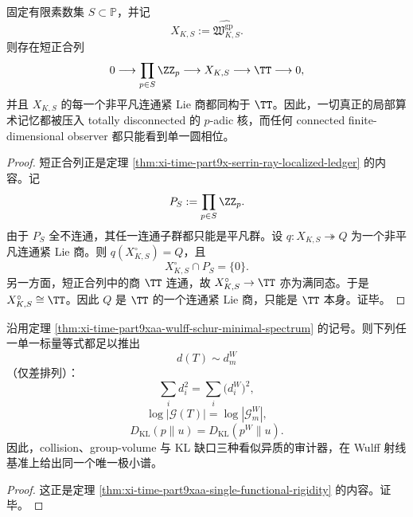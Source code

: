 \begin{theorem}\label{thm:xi-time-part9xaad-localized-wulff-connected-observer-rigidity}
固定有限素数集 \(S\subset\mathbb P\)，并记
\[
X_{K,S}:=\widehat{\mathfrak W_{K,S}^{\mathrm{gp}}}.
\]
则存在短正合列
\[
0\longrightarrow \prod_{p\in S}\ZZ_p
\longrightarrow X_{K,S}
\longrightarrow \TT
\longrightarrow 0,
\]
并且 \(X_{K,S}\) 的每一个非平凡连通紧 Lie 商都同构于 \(\TT\)。因此，一切真正的局部算术记忆都被压入 totally disconnected 的 \(p\)-adic 核，而任何 connected finite-dimensional observer 都只能看到单一圆相位。
\end{theorem}
\begin{proof}
短正合列正是定理 \ref{thm:xi-time-part9x-serrin-ray-localized-ledger} 的内容。记
\[
P_S:=\prod_{p\in S}\ZZ_p.
\]
由于 \(P_S\) 全不连通，其任一连通子群都只能是平凡群。设 \(q:X_{K,S}\twoheadrightarrow Q\) 为一个非平凡连通紧 Lie 商。则 \(q(X_{K,S}^\circ)=Q\)，且
\[
X_{K,S}^\circ\cap P_S=\{0\}.
\]
另一方面，短正合列中的商 \(\TT\) 连通，故 \(X_{K,S}^\circ\to \TT\) 亦为满同态。于是 \(X_{K,S}^\circ\cong \TT\)。因此 \(Q\) 是 \(\TT\) 的一个连通紧 Lie 商，只能是 \(\TT\) 本身。证毕。
\end{proof}

\begin{theorem}\label{thm:xi-time-part9xaad-wulff-single-functional-rigidity}
沿用定理 \ref{thm:xi-time-part9xaa-wulff-schur-minimal-spectrum} 的记号。则下列任一单一标量等式都足以推出
\[
d(T)\sim d_m^{W}
\]
（仅差排列）：
\[
\sum_i d_i^2=\sum_i \bigl(d_i^{W}\bigr)^2,
\]
\[
\log|\mathcal G(T)|=\log|\mathcal G_m^{W}|,
\]
\[
D_{\mathrm{KL}}(p\|u)=D_{\mathrm{KL}}(p^{W}\|u).
\]
因此，collision、group-volume 与 KL 缺口三种看似异质的审计器，在 Wulff 射线基准上给出同一个唯一极小谱。
\end{theorem}
\begin{proof}
这正是定理 \ref{thm:xi-time-part9xaa-single-functional-rigidity} 的内容。证毕。
\end{proof}

